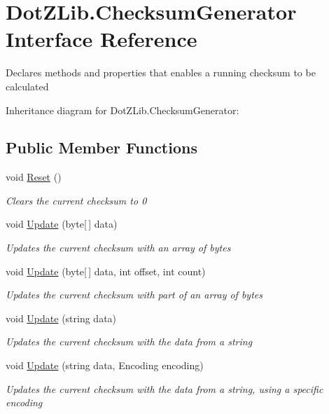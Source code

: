 \hypertarget{interface_dot_z_lib_1_1_checksum_generator}{\section{Dot\+Z\+Lib.\+Checksum\+Generator Interface Reference}
\label{interface_dot_z_lib_1_1_checksum_generator}
}


Declares methods and properties that enables a running checksum to be calculated  




Inheritance diagram for Dot\+Z\+Lib.\+Checksum\+Generator\+:
\subsection*{Public Member Functions}
\begin{DoxyCompactItemize}
\item 
void \hyperlink{interface_dot_z_lib_1_1_checksum_generator_ad01fdc9c4b4e5512dec8bc5072d97ffb}{Reset} ()
\begin{DoxyCompactList}\small\item\em Clears the current checksum to 0 \end{DoxyCompactList}\item 
void \hyperlink{interface_dot_z_lib_1_1_checksum_generator_a10930844922e72671843dd5c97709394}{Update} (byte\mbox{[}$\,$\mbox{]} data)
\begin{DoxyCompactList}\small\item\em Updates the current checksum with an array of bytes \end{DoxyCompactList}\item 
void \hyperlink{interface_dot_z_lib_1_1_checksum_generator_aeba84b3ca367362cb45f4a267354b53e}{Update} (byte\mbox{[}$\,$\mbox{]} data, int offset, int count)
\begin{DoxyCompactList}\small\item\em Updates the current checksum with part of an array of bytes \end{DoxyCompactList}\item 
void \hyperlink{interface_dot_z_lib_1_1_checksum_generator_ac5a728d2dd56479b429648177607fd39}{Update} (string data)
\begin{DoxyCompactList}\small\item\em Updates the current checksum with the data from a string \end{DoxyCompactList}\item 
void \hyperlink{interface_dot_z_lib_1_1_checksum_generator_ab894f35764ea30031c616517a6a00391}{Update} (string data, Encoding encoding)
\begin{DoxyCompactList}\small\item\em Updates the current checksum with the data from a string, using a specific encoding \end{DoxyCompactList}\end{DoxyCompactItemize}
